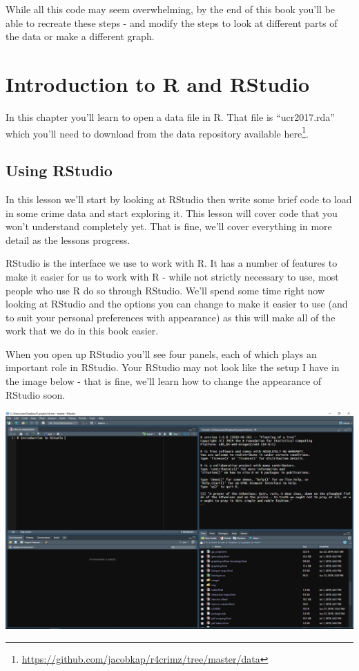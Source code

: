 \documentclass[
]{krantz}
\renewcommand{\href}[2]{#2\footnote{\url{#1}}}
\begin{document}
While all this code may seem overwhelming, by the end of this book you'll be able to recreate these steps - and modify the steps to look at different parts of the data or make a different graph.

\hypertarget{intro-to-r}{%
\chapter{Introduction to R and RStudio}\label{intro-to-r}}

In this chapter you'll learn to open a data file in R. That file is ``ucr2017.rda'' which you'll need to download from the data repository available \href{https://github.com/jacobkap/r4crimz/tree/master/data}{here}.

\hypertarget{using-rstudio}{%
\section{Using RStudio}\label{using-rstudio}}

In this lesson we'll start by looking at RStudio then write some brief code to load in some crime data and start exploring it. This lesson will cover code that you won't understand completely yet. That is fine, we'll cover everything in more detail as the lessons progress.

RStudio is the interface we use to work with R. It has a number of features to make it easier for us to work with R - while not strictly necessary to use, most people who use R do so through RStudio. We'll spend some time right now looking at RStudio and the options you can change to make it easier to use (and to suit your personal preferences with appearance) as this will make all of the work that we do in this book easier.

When you open up RStudio you'll see four panels, each of which plays an important role in RStudio. Your RStudio may not look like the setup I have in the image below - that is fine, we'll learn how to change the appearance of RStudio soon.

\includegraphics{images/rstudio_1.PNG}
\end{document}
